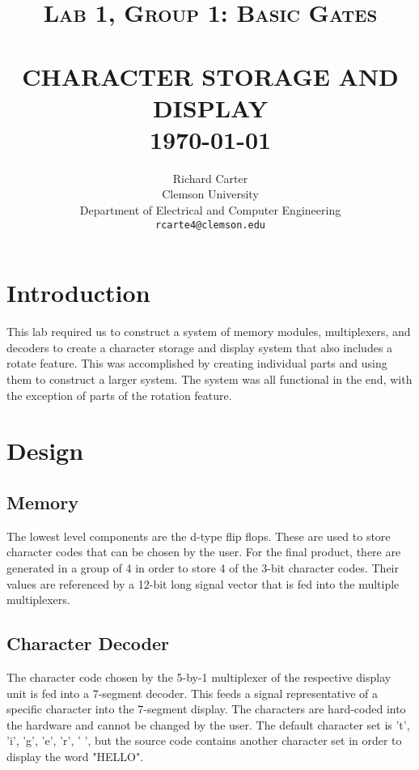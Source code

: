 \documentclass[paper=a4, fontsize=11pt,twoside]{scrartcl}
\title{	\normalsize \textsc{Lab 1, Group 1: Basic Gates} 	%
	\\[2.0cm]								%
	\HRule{0.5pt} \\						%
	\LARGE \textbf{\uppercase{character storage and display}}	%
	\HRule{2pt} \\ [0.5cm]		%
	\normalsize \today			%
}
\author{
	Richard Carter\\	
	Clemson University\\	
	Department of Electrical and Computer Engineering\\
	\texttt{rcarte4@clemson.edu} \\
}
\makeatletter
\def\printtitle{%
	{\centering \@title\par}}
\def\printauthor{%
	{\centering \large \@author}}
\makeatother
\begin{document}
\thispagestyle{empty}		%

\printtitle					%
\vfill
\printauthor				%
\newpage



\setcounter{page}{1}		%
\section{Introduction}

This lab required us to construct a system of memory modules, multiplexers, and decoders to create a character storage and display system that also includes a rotate feature. This was accomplished by creating individual parts and using them to construct a larger system. The system was all functional in the end, with the exception of parts of the rotation feature.

\section{Design}\label{design}
\subsection{Memory}
The lowest level components are the d-type flip flops. These are used to store character codes that can be chosen by the user. For the final product, there are generated in a group of 4 in order to store 4 of the 3-bit character codes. Their values are referenced by a 12-bit long signal vector that is fed into the multiple multiplexers.

\subsection{Character Decoder}
The character code chosen by the 5-by-1 multiplexer of the respective display unit is fed into a 7-segment decoder. This feeds a signal representative of a specific character into the 7-segment display. The characters are hard-coded into the hardware and cannot be changed by the user. The default character set is 't', 'i', 'g', 'e', 'r', ' ', but the source code contains another character set in order to display the word "HELLO".
\end{document}
